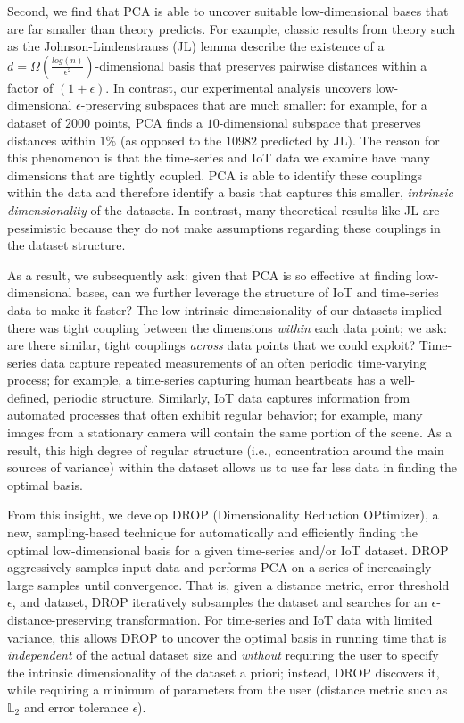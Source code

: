 Second, we find that PCA is able to uncover suitable low-dimensional bases that are far smaller than theory predicts.
For example, classic results from theory such as the Johnson-Lindenstrauss (JL) lemma describe the existence of a $d=\Omega(\frac{log(n)}{\epsilon^2})$-dimensional basis that preserves pairwise distances within a factor of $(1+\epsilon)$.
In contrast, our experimental analysis uncovers low-dimensional $\epsilon$-preserving subspaces that are much smaller: for example, for a dataset of $2000$ points, PCA finds a $10$-dimensional subspace that preserves distances within $1\%$ (as opposed to the $10982$ predicted by JL).
The reason for this phenomenon is that the time-series and IoT data we examine have many dimensions that are tightly coupled.
PCA is able to identify these couplings within the data and therefore identify a basis that captures this smaller, \textit{intrinsic dimensionality} of the datasets.
In contrast, many theoretical results like JL are pessimistic because they do not make assumptions regarding these couplings in the dataset structure.

As a result, we subsequently ask: given that PCA is so effective at finding low-dimensional bases, can we further leverage the structure of IoT and time-series data to make it faster?
The low intrinsic dimensionality of our datasets implied there was tight coupling between the dimensions \textit{within} each data point; we ask: are there similar, tight couplings \textit{across} data points that we could exploit?
Time-series data capture repeated measurements of an often periodic time-varying process; for example, a time-series capturing human heartbeats has a well-defined, periodic structure.
Similarly, IoT data captures information from automated processes that often exhibit regular behavior; for example, many images from a stationary camera will contain the same portion of the scene.
As a result, this high degree of regular structure (i.e., concentration around the main sources of variance) within the dataset allows us to use far less data in finding the optimal basis.

From this insight, we develop DROP (Dimensionality Reduction OPtimizer), a new, sampling-based technique for automatically and efficiently finding the optimal low-dimensional basis for a given time-series and/or IoT dataset.
DROP aggressively samples input data and performs PCA on a series of increasingly large samples until convergence.
That is, given a distance metric, error threshold $\epsilon$, and dataset, DROP iteratively subsamples the dataset and searches for an $\epsilon$-distance-preserving transformation.
For time-series and IoT data with limited variance, this allows DROP to uncover the optimal basis in running time that is \textit{independent} of the actual dataset size and \textit{without} requiring the user to specify the intrinsic dimensionality of the dataset a priori; instead, DROP discovers it, while requiring a minimum of parameters from the user (distance metric such as $\mathbb{L}_2$ and error tolerance $\epsilon$).

